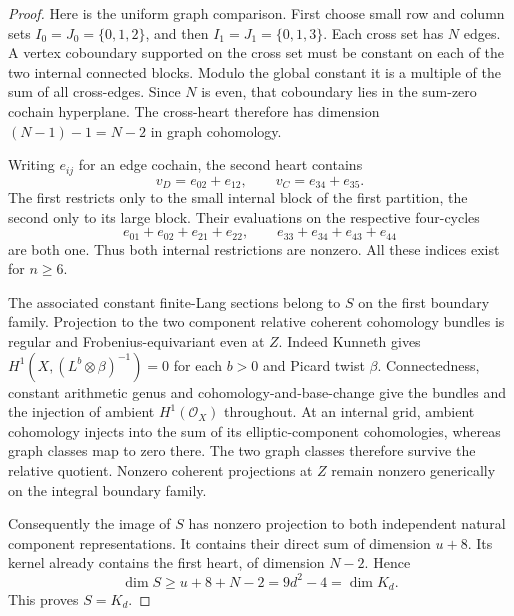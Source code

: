 \begin{proof}
Here is the uniform graph comparison. First choose small
row and column sets $I_0=J_0=\{0,1,2\}$, and then
$I_1=J_1=\{0,1,3\}$. Each cross set has $N$ edges.
A vertex coboundary supported on the cross set must be
constant on each of the two internal connected blocks.
Modulo the global constant it is a multiple of the sum
of all cross-edges. Since $N$ is even, that coboundary
lies in the sum-zero cochain hyperplane. The cross-heart
therefore has dimension $(N-1)-1=N-2$ in graph cohomology.

Writing $e_{ij}$ for an edge cochain, the second heart
contains
\[
                       v_D=e_{02}+e_{12},\qquad
                       v_C=e_{34}+e_{35}.
\]
The first restricts only to the small internal block of
the first partition, the second only to its large block.
Their evaluations on the respective four-cycles
\[
 e_{01}+e_{02}+e_{21}+e_{22},\qquad
 e_{33}+e_{34}+e_{43}+e_{44}
\]
are both one. Thus both internal restrictions are nonzero.
All these indices exist for $n\geq6$.

The associated constant finite-Lang sections belong to
$S$ on the first boundary family. Projection to the two
component relative coherent cohomology bundles is regular
and Frobenius-equivariant even at $Z$. Indeed Kunneth gives
$H^1(X,(L^b\otimes\beta)^{-1})=0$ for each $b>0$ and
Picard twist $\beta$. Connectedness, constant arithmetic
genus and cohomology-and-base-change give the bundles and
the injection of ambient $H^1(\mathcal O_X)$ throughout.
At an internal grid, ambient cohomology injects into the
sum of its elliptic-component cohomologies, whereas graph
classes map to zero there. The two graph classes therefore
survive the relative quotient. Nonzero coherent projections
at $Z$ remain nonzero generically on the integral boundary
family.

Consequently the image of $S$ has nonzero projection to
both independent natural component representations. It
contains their direct sum of dimension $u+8$. Its kernel
already contains the first heart, of dimension $N-2$.
Hence
\[
                 \dim S\geq u+8+N-2=9d^2-4=\dim K_d.
\]
This proves $S=K_d$.
\end{proof}

